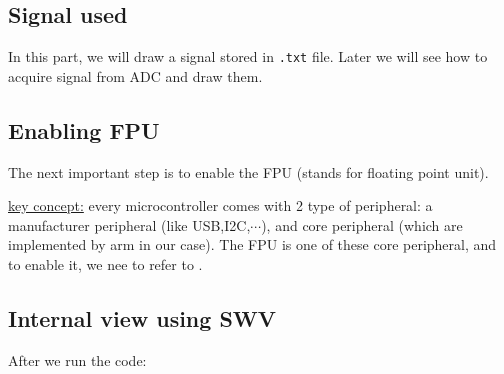 \documentclass[12pt,a4paper]{book}
\begin{document}
\subsection{Signal used}

In this part, we will draw a signal stored in \verb|.txt| file. Later we will see how to acquire signal from ADC and draw them.


\subsection{Enabling FPU}

The next important step is to enable the FPU (stands for floating point unit).

\underline{key concept:} every microcontroller comes with 2 type of peripheral: a manufacturer peripheral (like USB,I2C,$\cdots$), and core peripheral (which are implemented by arm in our case). The FPU is one of these core peripheral, and to enable it, we nee to refer to .

\newpage
\subsection{Internal view using SWV}

After we run the code:
\end{document}
